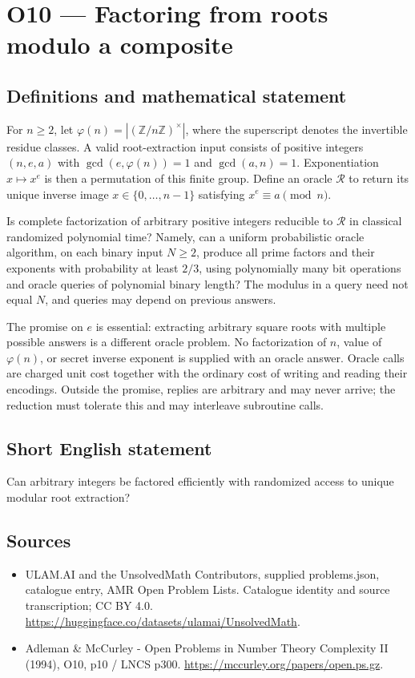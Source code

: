 \documentclass[11pt,a4paper]{article}
\begin{document}
\section*{O10 — Factoring from roots modulo a composite}\label{statement}

\subsection{Definitions and mathematical statement}
For $n\ge2$, let $\varphi(n)=|(\mathbb Z/n\mathbb Z)^\times|$, where the superscript denotes the invertible residue classes. A valid root-extraction input consists of positive integers $(n,e,a)$ with $\gcd(e,\varphi(n))=1$ and $\gcd(a,n)=1$. Exponentiation $x\mapsto x^e$ is then a permutation of this finite group. Define an oracle $\mathcal R$ to return its unique inverse image $x\in\{0,\ldots,n-1\}$ satisfying $x^e\equiv a\pmod n$.

Is complete factorization of arbitrary positive integers reducible to $\mathcal R$ in classical randomized polynomial time? Namely, can a uniform probabilistic oracle algorithm, on each binary input $N\ge2$, produce all prime factors and their exponents with probability at least $2/3$, using polynomially many bit operations and oracle queries of polynomial binary length? The modulus in a query need not equal $N$, and queries may depend on previous answers.

The promise on $e$ is essential: extracting arbitrary square roots with multiple possible answers is a different oracle problem. No factorization of $n$, value of $\varphi(n)$, or secret inverse exponent is supplied with an oracle answer. Oracle calls are charged unit cost together with the ordinary cost of writing and reading their encodings. Outside the promise, replies are arbitrary and may never arrive; the reduction must tolerate this and may interleave subroutine calls.
\subsection{Short English statement}
Can arbitrary integers be factored efficiently with randomized access to unique modular root extraction?
\subsection{Sources}
\begin{itemize}
\item[S1] ULAM.AI and the UnsolvedMath Contributors, supplied problems.json, catalogue entry, AMR Open Problem Lists. Catalogue identity and source transcription; CC BY 4.0.
\url{https://huggingface.co/datasets/ulamai/UnsolvedMath}.
\item[S2] Adleman \& McCurley - Open Problems in Number Theory Complexity II (1994), O10, p10 / LNCS p300. 
\url{https://mccurley.org/papers/open.ps.gz}.
\end{itemize}
\end{document}
